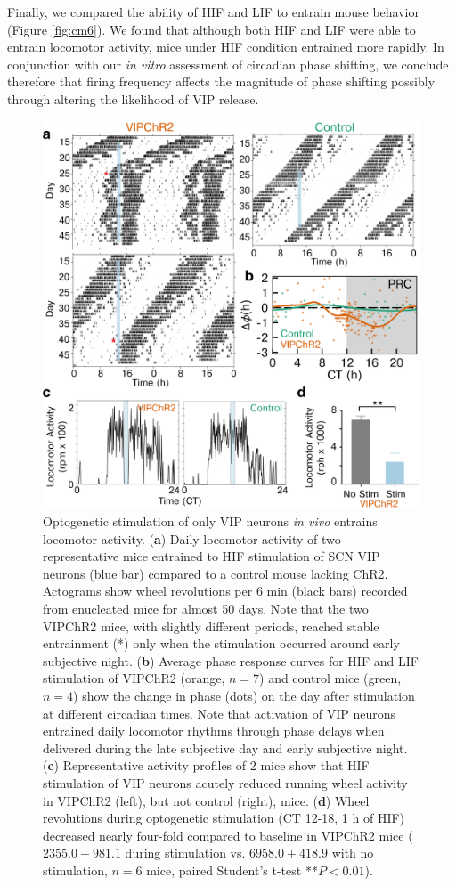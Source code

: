 Finally, we compared the ability of HIF and LIF to entrain mouse behavior (Figure \ref{fig:cm6}).
We found that although both HIF and LIF were able to entrain locomotor activity, mice under HIF condition entrained more rapidly.
In conjunction with our \textit{in vitro} assessment of circadian phase shifting, we conclude therefore that firing frequency affects the magnitude of phase shifting possibly through altering the likelihood of VIP release.
\clearpage
\begin{figure}[p]
    \begin{center}
        \includegraphics[width=4.5in]{chap5/figures/Figure5.png}
    \end{center}
    \caption{\label{fig:cm5}
    Optogenetic stimulation of only VIP neurons \textit{in vivo} entrains locomotor activity. 
    (\textbf{a}) Daily locomotor activity of two representative mice entrained to HIF stimulation of SCN VIP neurons (blue bar) compared to a control mouse lacking ChR2. Actograms show wheel revolutions per 6 min (black bars) recorded from enucleated mice for almost 50 days. Note that the two VIPChR2 mice, with slightly different periods, reached stable entrainment (*) only when the stimulation occurred around early subjective night. 
    (\textbf{b}) Average phase response curves for HIF and LIF stimulation of VIPChR2 (orange, $n = 7$) and control mice (green, $n = 4$) show the change in phase (dots) on the day after stimulation at different circadian times. Note that activation of VIP neurons entrained daily locomotor rhythms through phase delays when delivered during the late subjective day and early subjective night.
    (\textbf{c}) Representative activity profiles of 2 mice show that HIF stimulation of VIP neurons acutely reduced running wheel activity in VIPChR2 (left), but not control (right), mice. 
    (\textbf{d}) Wheel revolutions during optogenetic stimulation (CT 12-18, 1 h of HIF) decreased nearly four-fold compared to baseline in VIPChR2 mice ($2355.0 \pm 981.1$ during stimulation vs. $6958.0 \pm 418.9$ with no stimulation, $n = 6$ mice, paired Student's t-test **$P< 0.01$). 
    }
\end{figure}
